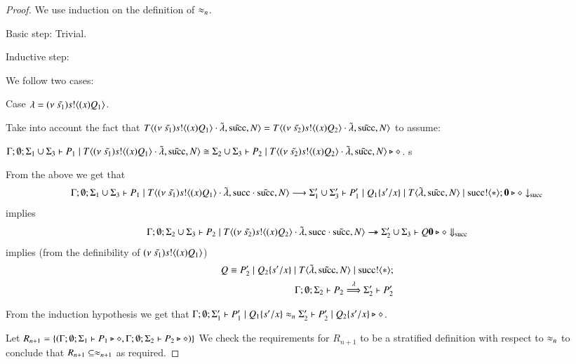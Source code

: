 \begin{proof}
	We use induction on the definition of $\approx_n$.

	Basic step: Trivial.

	Inductive step:

	We follow two cases:

	Case $\lambda = (\nu\ \tilde{s_1}) s ! \langle (x)Q_1 \rangle$.

	Take into account the fact that
	$T\langle (\nu\ \tilde{s_1}) s ! \langle (x)Q_1 \rangle \cdot \tilde{\lambda}, \tilde{\textrm{succ}}, N \rangle = T\langle (\nu\ \tilde{s_2}) s ! \langle (x)Q_2 \rangle \cdot \tilde{\lambda}, \tilde{\textrm{succ}}, N \rangle$
	to assume:

	$\Gamma; \emptyset; \Sigma_1 \cup \Sigma_3 \vdash P_1 \;|\; T\langle (\nu\ \tilde{s_1}) s ! \langle (x)Q_1 \rangle \cdot \tilde{\lambda}, \tilde{\textrm{succ}}, N \rangle \cong \Sigma_2 \cup \Sigma_3 \vdash P_2 \;|\; T\langle (\nu\ \tilde{s_2}) s ! \langle (x)Q_2 \rangle \cdot \tilde{\lambda}, \tilde{\textrm{succ}}, N \rangle \triangleright \diamond$.
s

	From the above we get that
	\[
		\Gamma; \emptyset; \Sigma_1 \cup \Sigma_3 \vdash P_1 \;|\; T\langle (\nu\ \tilde{s_1}) s ! \langle (x)Q_1 \rangle \cdot \tilde{\lambda}, \textrm{succ} \cdot \tilde{\textrm{succ}}, N \rangle \longrightarrow \Sigma_1' \cup \Sigma_3' \vdash P_1' \;|\; Q_1 \{s'/x \} \;|\; T\langle \tilde{\lambda}, \tilde{\textrm{succ}}, N \rangle \;|\; \textrm{succ} ! \langle \ast \rangle ; \mathbf{0} \triangleright \diamond \downarrow_{\textrm{succ}}
	\]
	implies
	\[
		\Gamma; \emptyset; \Sigma_2 \cup \Sigma_3 \vdash P_2 \;|\; T\langle (\nu\ \tilde{s_2}) s ! \langle (x)Q_2 \rangle \cdot \tilde{\lambda}, \textrm{succ} \cdot \tilde{\textrm{succ}}, N \rangle \rightarrow\!\!\!\!\!\rightarrow \Sigma_2' \cup \Sigma_3 \vdash Q \mathbf{0} \triangleright \diamond \Downarrow_{\textrm{succ}}
	\]
	implies (from the definibility of $(\nu\ \tilde{s_1}) s ! \langle (x)Q_1 \rangle$)
	\begin{eqnarray}
		Q \equiv P_2' \;|\; Q_2 \{s'/x \} \;|\; T\langle \tilde{\lambda}, \tilde{\textrm{succ}}, N \rangle \;|\; \textrm{succ} ! \langle \ast \rangle ;\\
		\Gamma; \emptyset; \Sigma_2 \vdash P_2 \stackrel{\lambda}{\Longrightarrow} \Sigma_2' \vdash P_2'
	\end{eqnarray}

	From the induction hypothesis we get that
	$\Gamma;\emptyset; \Sigma_1' \vdash P_1' \;|\; Q_1 \{s'/x \} \approx_n \Sigma_2' \vdash P_2' \;|\; Q_2 \{s'/x \} \triangleright \diamond$.

	Let $R_{n+1} = \{(\Gamma; \emptyset; \Sigma_1 \vdash P_1 \triangleright \diamond, \Gamma; \emptyset; \Sigma_2 \vdash P_2 \triangleright \diamond)\}$
	We check the requirements for $R_{n+1}$ to be a stratified definition with respect
	to $\approx_n$ to conclude that $R_{n+1} \subseteq \approx_{n+1}$ as required.


\end{proof}
